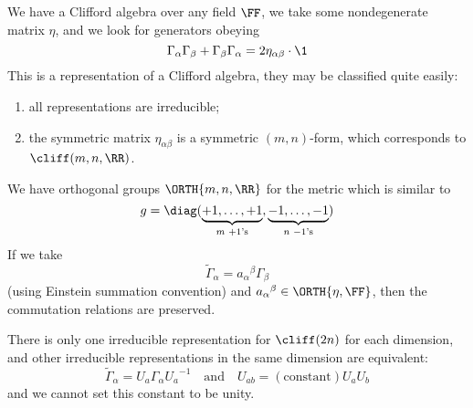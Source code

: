 We have a Clifford algebra over any field $\FF$, we take some
nondegenerate matrix $\eta$, and we look for generators obeying
\begin{equation}
\Gamma_{\alpha}\Gamma_{\beta}+\Gamma_{\beta}\Gamma_{\alpha}=2\eta_{\alpha\beta}\cdot\1
\end{equation}
This is a representation of a Clifford algebra, they may be
classified quite easily:
\begin{enumerate}
\item all representations are irreducible;
\item the symmetric matrix $\eta_{\alpha\beta}$ is a symmetric
  $(m,n)$-form, which corresponds to $\cliff(m,n,\RR)$.
\end{enumerate}
We have orthogonal groups $\ORTH{m,n,\RR}$ for the metric which
is similar to
\begin{equation}
g = \diag(\underbrace{+1,\dots,+1}_{\text{$m$
    $+1$'s}},\underbrace{-1,\dots,-1}_{\text{$n$ $-1$'s}})
\end{equation}
If we take
\begin{equation}
\widetilde\Gamma_{\alpha}={a_{\alpha}}^{\beta}\Gamma_{\beta}
\end{equation}
(using Einstein summation convention) and
${a_{\alpha}}^{\beta}\in\ORTH{\eta,\FF}$, then the commutation
relations are preserved.

\begin{ClassificationCliff}
There is only one irreducible representation for $\cliff(2n)$ for
each dimension, and other irreducible representations in the same
dimension are equivalent:
\begin{equation}
\widetilde{\Gamma}_{\alpha}=U_{a}\Gamma_{\alpha}{U_{a}}^{-1}\quad\mbox{and}\quad
U_{ab}=(\mbox{constant})U_{a}U_{b}
\end{equation}
and we cannot set this constant to be unity.
\end{ClassificationCliff}

